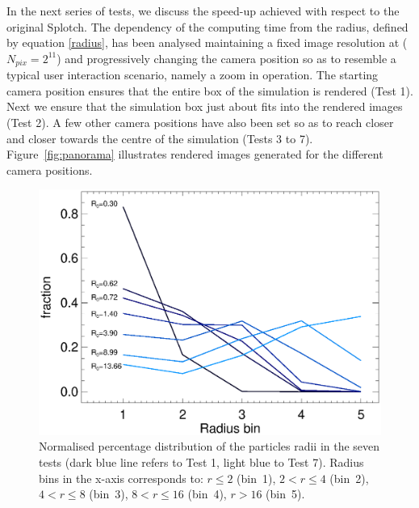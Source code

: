 \documentclass[smallextended]{svjour3}
\begin{document}
In the next series of tests, we discuss the speed-up achieved with respect to the original Splotch. 
The dependency of the computing time from the radius, defined by equation \eqref{radius}, has been analysed maintaining a fixed image resolution at ($N_{pix} = 2^{11}$) and progressively changing the camera position 
so as to resemble a typical user interaction scenario, namely a zoom in operation. 
The starting camera position ensures that the entire box of the simulation is rendered (Test 1). 
Next we ensure that the simulation box just about fits into the rendered images (Test 2). 
A few other camera positions have also been set so as to reach closer and closer towards the 
centre of the simulation (Tests 3 to 7). Figure~\ref{fig:panorama} illustrates rendered images generated for the different camera positions.

\begin{figure}
\includegraphics[scale=0.5]{radii.eps}
\caption{Normalised percentage distribution of the particles radii in the seven tests (dark blue line refers to Test 1, light blue to Test 7). Radius bins in the x-axis corresponds to: $r\le 2$ (bin~1), $2<r\le 4$ (bin~2), $4<r\le 8$ (bin~3), $8<r\le 16$ (bin~4), $r>16$ (bin~5). 
}
\label{fig:radii}
\end{figure}
\end{document}
